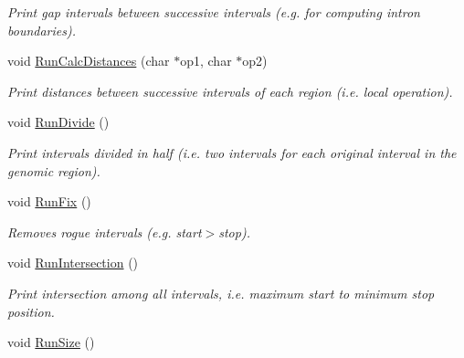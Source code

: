 \begin{CompactItemize}
\begin{CompactList}\small\item\em Print gap intervals between successive intervals (e.g. for computing intron boundaries). \item\end{CompactList}\item 
\hypertarget{classGenomicRegionSet_22f3fce9421a0f80c96ec0a9346fec19}{
void \hyperlink{classGenomicRegionSet_22f3fce9421a0f80c96ec0a9346fec19}{RunCalcDistances} (char $\ast$op1, char $\ast$op2)}
\label{classGenomicRegionSet_22f3fce9421a0f80c96ec0a9346fec19}

\begin{CompactList}\small\item\em Print distances between successive intervals of each region (i.e. local operation). \item\end{CompactList}\item 
\hypertarget{classGenomicRegionSet_9acb3424739ed62c0efddad01536ad18}{
void \hyperlink{classGenomicRegionSet_9acb3424739ed62c0efddad01536ad18}{RunDivide} ()}
\label{classGenomicRegionSet_9acb3424739ed62c0efddad01536ad18}

\begin{CompactList}\small\item\em Print intervals divided in half (i.e. two intervals for each original interval in the genomic region). \item\end{CompactList}\item 
\hypertarget{classGenomicRegionSet_efa09dc62c768a06e4ca1f56fd683be5}{
void \hyperlink{classGenomicRegionSet_efa09dc62c768a06e4ca1f56fd683be5}{RunFix} ()}
\label{classGenomicRegionSet_efa09dc62c768a06e4ca1f56fd683be5}

\begin{CompactList}\small\item\em Removes rogue intervals (e.g. start$>$stop). \item\end{CompactList}\item 
\hypertarget{classGenomicRegionSet_e598cd9c5f94555a04e43f9fe6334aec}{
void \hyperlink{classGenomicRegionSet_e598cd9c5f94555a04e43f9fe6334aec}{RunIntersection} ()}
\label{classGenomicRegionSet_e598cd9c5f94555a04e43f9fe6334aec}

\begin{CompactList}\small\item\em Print intersection among all intervals, i.e. maximum start to minimum stop position. \item\end{CompactList}\item 
\hypertarget{classGenomicRegionSet_b1e96bd7781dac63a1745a8cf5ac5538}{
void \hyperlink{classGenomicRegionSet_b1e96bd7781dac63a1745a8cf5ac5538}{RunSize} ()}
\label{classGenomicRegionSet_b1e96bd7781dac63a1745a8cf5ac5538}


\end{CompactItemize}
